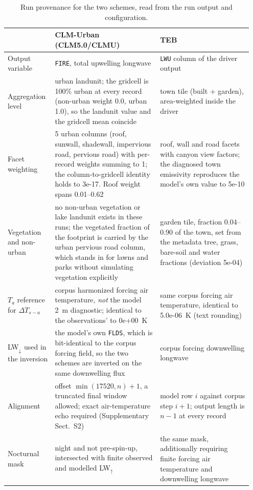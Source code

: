 \begin{table}[!tbp]
\centering\footnotesize
\caption{Run provenance for the two schemes, read from the run output and configuration.}
\label{tab:prov}
\setlength{\tabcolsep}{3pt}
\renewcommand{\arraystretch}{1.0}
\begingroup\scriptsize
\begin{tabular}{@{}p{0.18\linewidth}p{0.41\linewidth}p{0.36\linewidth}@{}}
\toprule
 & CLM-Urban (CLM5.0/CLMU) & TEB \\
\midrule
Output variable & \texttt{FIRE}, total upwelling longwave & \texttt{LWU} column of the driver output \\
Aggregation level & urban landunit; the gridcell is 100\% urban at every record (non-urban weight 0.0, urban 1.0), so the landunit value and the gridcell mean coincide & town tile (built + garden), area-weighted inside the driver \\
Facet weighting & 5 urban columns (roof, sunwall, shadewall, impervious road, pervious road) with per-record weights summing to 1; the column-to-gridcell identity holds to 3e-17. Roof weight spans 0.01--0.62 & roof, wall and road facets with canyon view factors; the diagnosed town emissivity reproduces the model's own value to 5e-10 \\
Vegetation and non-urban & no non-urban vegetation or lake landunit exists in these runs; the vegetated fraction of the footprint is carried by the urban pervious road column, which stands in for lawns and parks without simulating vegetation explicitly & garden tile, fraction 0.04--0.90 of the town, set from the metadata tree, grass, bare-soil and water fractions (deviation 5e-04) \\
$T_a$ reference for $\Delta T_{s-a}$ & corpus harmonized forcing air temperature, \emph{not} the model 2~m diagnostic; identical to the observations' to 0e+00~K & same corpus forcing air temperature, identical to 5.0e-06~K (text rounding) \\
LW$_{\downarrow}$ used in the inversion & the model's own \texttt{FLDS}, which is bit-identical to the corpus forcing field, so the two schemes are inverted on the same downwelling flux & corpus forcing downwelling longwave \\
Alignment & offset $\min(17520,n)+1$, a truncated final window allowed; exact air-temperature echo required (Supplementary Sect.~S2) & model row $i$ against corpus step $i{+}1$; output length is $n-1$ at every record \\
Nocturnal mask & night and not pre-spin-up, intersected with finite observed and modelled LW$_{\uparrow}$ & the same mask, additionally requiring finite forcing air temperature and downwelling longwave \\
\bottomrule
\end{tabular}
\endgroup
\end{table}
